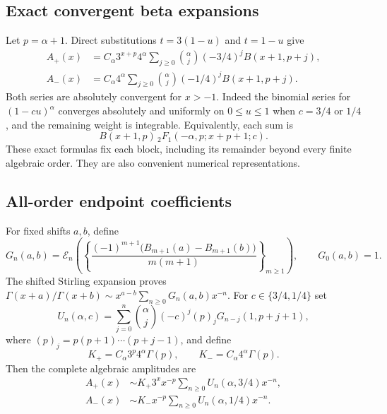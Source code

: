 \documentclass[11pt,a4paper]{article}
\theoremstyle{definition}
\theoremstyle{remark}
\newcommand{\ExpC}{\mathcal E}
\numberwithin{equation}{section}
\begin{document}
\subsection{Exact convergent beta expansions}
Let $p=\alpha+1$. Direct substitutions $t=3(1-u)$ and $t=1-u$ give
\begin{align}
 A_+(x)&=C_\alpha3^{x+p}4^\alpha
 \sum_{j\ge0}\binom\alpha j(-3/4)^j B(x+1,p+j),\nonumber\\
 A_-(x)&=C_\alpha4^\alpha
 \sum_{j\ge0}\binom\alpha j(-1/4)^j B(x+1,p+j).
 \label{eq:betablocks}
\end{align}
Both series are absolutely convergent for $x>-1$. Indeed the binomial series for $(1-cu)^\alpha$ converges absolutely and uniformly on $0\le u\le1$ when $c=3/4$ or $1/4$, and the remaining weight is integrable. Equivalently, each sum is
\begin{equation}
 B(x+1,p)\,{}_2F_1(-\alpha,p;x+p+1;c).
 \label{eq:hyperblock}
\end{equation}
These exact formulas fix each block, including its remainder beyond every finite algebraic order. They are also convenient numerical representations.

\subsection{All-order endpoint coefficients}
For fixed shifts $a,b$, define
\begin{equation}
 G_n(a,b)=\ExpC_n\!\left(
 \left\{\frac{(-1)^{m+1}\bigl(B_{m+1}(a)-B_{m+1}(b)\bigr)}{m(m+1)}\right\}_{m\ge1}
 \right),\qquad G_0(a,b)=1.
 \label{eq:gammaratiocoeff}
\end{equation}
The shifted Stirling expansion proves
$\Gamma(x+a)/\Gamma(x+b)\sim x^{a-b}\sum_{n\ge0}G_n(a,b)x^{-n}$.
For $c\in\{3/4,1/4\}$ set
\begin{equation}
 U_n(\alpha,c)=\sum_{j=0}^n\binom\alpha j(-c)^j(p)_j
 G_{n-j}(1,p+j+1),
 \label{eq:endpointcoeff}
\end{equation}
where $(p)_j=p(p+1)\cdots(p+j-1)$, and define
\begin{equation}
 K_+=C_\alpha3^p4^\alpha\Gamma(p),\qquad
 K_-=C_\alpha4^\alpha\Gamma(p).
 \label{eq:endpointconstants}
\end{equation}
Then the complete algebraic amplitudes are
\begin{align}
 A_+(x)&\sim K_+3^x x^{-p}\sum_{n\ge0}U_n(\alpha,3/4)x^{-n},\nonumber\\
 A_-(x)&\sim K_-x^{-p}\sum_{n\ge0}U_n(\alpha,1/4)x^{-n}.
 \label{eq:endpointasympt}
\end{align}
\end{document}
